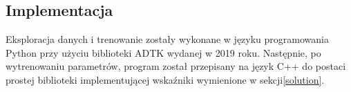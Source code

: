 \subsection{Implementacja}
Eksploracja danych i trenowanie zostały wykonane w języku programowania Python przy użyciu biblioteki ADTK \cite{ADTK} wydanej w 2019 roku.
Następnie, po wytrenowaniu parametrów, program został przepisany na język C++ do postaci prostej biblioteki implementującej wskaźniki wymienione w sekcji\ref{solution}.
\printbibliography